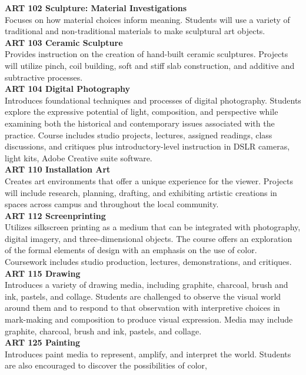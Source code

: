\documentclass[
  letterpaper,
]{scrbook}
\begin{document}
\textbf{ART 102 Sculpture: Material Investigations}\\
Focuses on how material choices inform meaning. Students will use a
variety of traditional and non-traditional materials to make sculptural
art objects.\\
\textbf{ART 103 Ceramic Sculpture}\\
Provides instruction on the creation of hand-built ceramic sculptures.
Projects will utilize pinch, coil building, soft and stiff slab
construction, and additive and subtractive processes.\\
\textbf{ART 104 Digital Photography}\\
Introduces foundational techniques and processes of digital photography.
Students explore the expressive potential of light, composition, and
perspective while examining both the historical and contemporary issues
associated with the practice. Course includes studio projects, lectures,
assigned readings, class discussions, and critiques plus
introductory-level instruction in DSLR cameras, light kits, Adobe
Creative suite software.\\
\textbf{ART 110 Installation Art}\\
Creates art environments that offer a unique experience for the viewer.
Projects will include research, planning, drafting, and exhibiting
artistic creations in spaces across campus and throughout the local
community.\\
\textbf{ART 112 Screenprinting}\\
Utilizes silkscreen printing as a medium that can be integrated with
photography, digital imagery, and three-dimensional objects. The course
offers an exploration of the formal elements of design with an emphasis
on the use of color. Coursework includes studio production, lectures,
demonstrations, and critiques.\\
\textbf{ART 115 Drawing}\\
Introduces a variety of drawing media, including graphite, charcoal,
brush and ink, pastels, and collage. Students are challenged to observe
the visual world around them and to respond to that observation with
interpretive choices in mark-making and composition to produce visual
expression. Media may include graphite, charcoal, brush and ink,
pastels, and collage.\\
\textbf{ART 125 Painting}\\
Introduces paint media to represent, amplify, and interpret the world.
Students are also encouraged to discover the possibilities of color,
\end{document}
